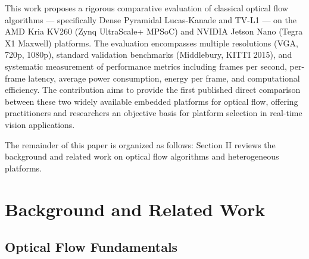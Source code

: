 \documentclass[conference]{IEEEtran}
\begin{document}
This work proposes a rigorous comparative evaluation of classical optical flow algorithms --- specifically Dense Pyramidal Lucas-Kanade and TV-L1 --- on the AMD Kria KV260 (Zynq UltraScale+ MPSoC) and NVIDIA Jetson Nano (Tegra X1 Maxwell) platforms. The evaluation encompasses multiple resolutions (VGA, 720p, 1080p), standard validation benchmarks (Middlebury, KITTI 2015), and systematic measurement of performance metrics including frames per second, per-frame latency, average power consumption, energy per frame, and computational efficiency. The contribution aims to provide the first published direct comparison between these two widely available embedded platforms for optical flow, offering practitioners and researchers an objective basis for platform selection in real-time vision applications.

The remainder of this paper is organized as follows: Section II reviews the background and related work on optical flow algorithms and heterogeneous platforms.

\section{Background and Related Work}

\subsection{Optical Flow Fundamentals}
\end{document}
